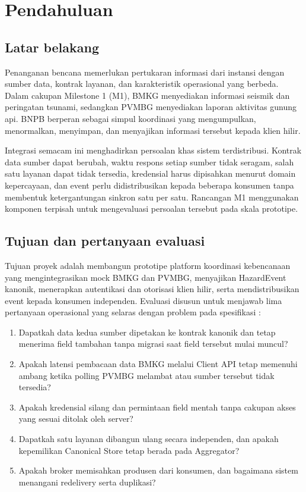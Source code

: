 \documentclass{fairmeta}
\begin{document}
\clearpage
\begingroup
\hypersetup{linkcolor=metafg}
\tableofcontents
\listoffigures
\listoftables
\endgroup
\clearpage
{}
\hypersetup{pageanchor=true}

\section{Pendahuluan}

\subsection{Latar belakang}

Penanganan bencana memerlukan pertukaran informasi dari instansi dengan sumber data, kontrak layanan, dan karakteristik operasional yang berbeda. Dalam cakupan Milestone 1 (M1), BMKG menyediakan informasi seismik dan peringatan tsunami, sedangkan PVMBG menyediakan laporan aktivitas gunung api. BNPB berperan sebagai simpul koordinasi yang mengumpulkan, menormalkan, menyimpan, dan menyajikan informasi tersebut kepada klien hilir.

Integrasi semacam ini menghadirkan persoalan khas sistem terdistribusi. Kontrak data sumber dapat berubah, waktu respons setiap sumber tidak seragam, salah satu layanan dapat tidak tersedia, kredensial harus dipisahkan menurut domain kepercayaan, dan event perlu didistribusikan kepada beberapa konsumen tanpa membentuk ketergantungan sinkron satu per satu. Rancangan M1 menggunakan komponen terpisah untuk mengevaluasi persoalan tersebut pada skala prototipe.

\subsection{Tujuan dan pertanyaan evaluasi}

Tujuan proyek adalah membangun prototipe platform koordinasi kebencanaan yang mengintegrasikan mock BMKG dan PVMBG, menyajikan HazardEvent kanonik, menerapkan autentikasi dan otorisasi klien hilir, serta mendistribusikan event kepada konsumen independen. Evaluasi disusun untuk menjawab lima pertanyaan operasional yang selaras dengan problem pada spesifikasi \cite{spec-m1}:
\begin{enumerate}
  \item Dapatkah data kedua sumber dipetakan ke kontrak kanonik dan tetap menerima field tambahan tanpa migrasi saat field tersebut mulai muncul?
  \item Apakah latensi pembacaan data BMKG melalui Client API tetap memenuhi ambang ketika polling PVMBG melambat atau sumber tersebut tidak tersedia?
  \item Apakah kredensial silang dan permintaan field mentah tanpa cakupan akses yang sesuai ditolak oleh server?
  \item Dapatkah satu layanan dibangun ulang secara independen, dan apakah kepemilikan Canonical Store tetap berada pada Aggregator?
  \item Apakah broker memisahkan produsen dari konsumen, dan bagaimana sistem menangani redelivery serta duplikasi?
\end{enumerate}
\end{document}
